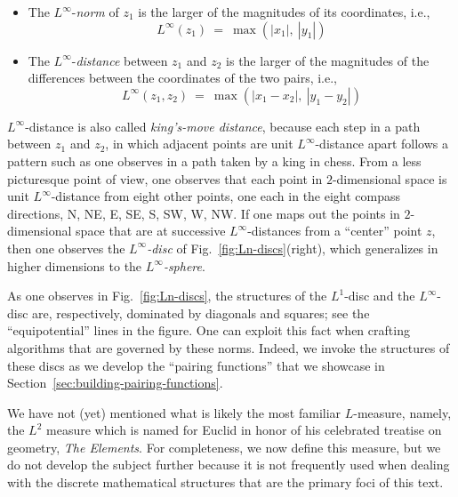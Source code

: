 \begin{itemize}
\item
The $L^\infty$-{\it norm} of $z_1$ is the larger of the magnitudes of its coordinates, i.e.,
\[ L^\infty(z_1) \ = \ \max(|x_1|, \ |y_1|)  \]  

\item
The $L^\infty$-{\it distance} between $z_1$ and $z_2$ is the larger of the magnitudes of the
differences between the coordinates of the two pairs, i.e.,
\[ L^\infty(z_1, z_2) \ = \ \max(|x_1 - x_2|, \  |y_1 - y_2|) \]
\end{itemize}
$L^\infty$-distance is also called {\it king's-move distance}, because each step in a path between $z_1$ and $z_2$, in which adjacent points are unit $L^\infty$-distance apart follows a pattern such as one observes in a path taken by a king in chess.  From a less picturesque point of view, one observes that each point in $2$-dimensional space is unit $L^\infty$-distance from eight other points, one each in the eight compass directions, N, NE, E, SE, S, SW, W, NW.  If one maps out the points in $2$-dimensional space that are at successive $L^\infty$-distances from a ``center'' point $z$, then one observes the {\it $L^\infty$-disc} of Fig.~\ref{fig:Ln-discs}(right), which generalizes in higher dimensions to the {\it $L^\infty$-sphere}.
  

\smallskip

As one observes in Fig.~\ref{fig:Ln-discs}, the structures of the $L^1$-disc and the $L^\infty$-disc are, respectively, dominated by diagonals and squares; see the ``equipotential'' lines in the figure.  One can exploit this fact when crafting algorithms that are governed by these norms.  Indeed, we invoke the structures of these discs as we develop the ``pairing functions'' that we showcase in Section~\ref{sec:building-pairing-functions}.

\bigskip


We have not (yet) mentioned what is likely the most familiar $L$-measure, namely, the $L^2$ measure which is named for Euclid in honor of his celebrated treatise on geometry, {\it The Elements}.  For completeness, we now define this measure, but we do not develop the subject further because it is not frequently used when dealing with the discrete mathematical structures
that are the primary foci of this text.


